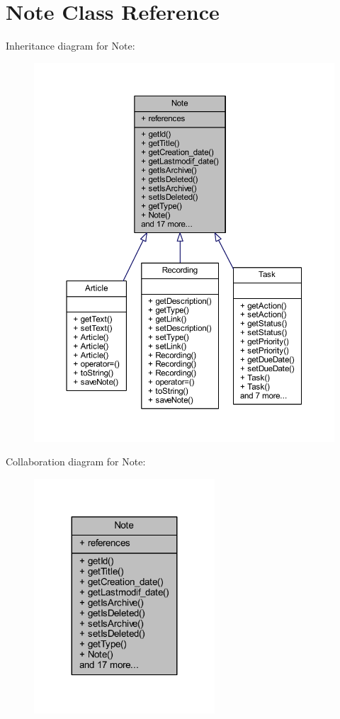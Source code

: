 \hypertarget{class_note}{}\section{Note Class Reference}
\label{class_note}


Inheritance diagram for Note\+:
\nopagebreak
\begin{figure}[H]
\begin{center}
\leavevmode
\includegraphics[width=350pt]{class_note__inherit__graph}
\end{center}
\end{figure}


Collaboration diagram for Note\+:
\nopagebreak
\begin{figure}[H]
\begin{center}
\leavevmode
\includegraphics[width=191pt]{class_note__coll__graph}
\end{center}
\end{figure}
